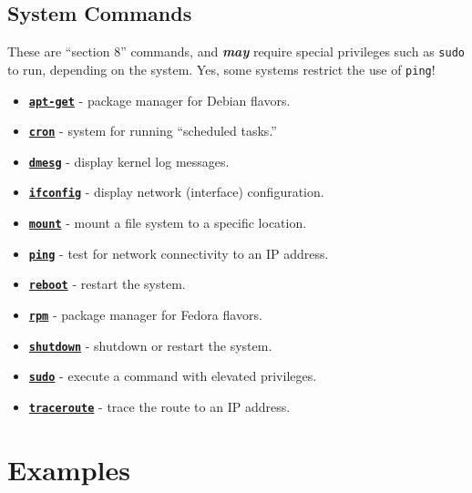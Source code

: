 \documentclass[10pt,]{book}
\numberwithin{figure}{chapter}
\begin{document}
\subsection{System Commands}\label{system-commands}

These are ``section 8'' commands, and \textbf{\emph{may}} require
special privileges such as \texttt{sudo} to run, depending on the
system. Yes, some systems restrict the use of \texttt{ping}!

\begin{itemize}
\itemsep1pt\parskip0pt
\item
  \href{http://linux.die.net/man/8/apt-get}{\textbf{\texttt{apt-get}}} -
  package manager for Debian flavors.
\item
  \href{http://linux.die.net/man/8/cron}{\textbf{\texttt{cron}}} -
  system for running ``scheduled tasks.''
\item
  \href{http://linux.die.net/man/8/dmesg}{\textbf{\texttt{dmesg}}} -
  display kernel log messages.
\item
  \href{http://linux.die.net/man/8/ifconfig}{\textbf{\texttt{ifconfig}}}
  - display network (interface) configuration.
\item
  \href{http://linux.die.net/man/8/mount}{\textbf{\texttt{mount}}} -
  mount a file system to a specific location.
\item
  \href{http://linux.die.net/man/8/ping}{\textbf{\texttt{ping}}} - test
  for network connectivity to an IP address.
\item
  \href{http://linux.die.net/man/8/reboot}{\textbf{\texttt{reboot}}} -
  restart the system.
\item
  \href{http://linux.die.net/man/8/rpm}{\textbf{\texttt{rpm}}} - package
  manager for Fedora flavors.
\item
  \href{http://linux.die.net/man/8/shutdown}{\textbf{\texttt{shutdown}}}
  - shutdown or restart the system.
\item
  \href{http://linux.die.net/man/8/sudo}{\textbf{\texttt{sudo}}} -
  execute a command with elevated privileges.
\item
  \href{http://linux.die.net/man/8/traceroute}{\textbf{\texttt{traceroute}}}
  - trace the route to an IP address.
\end{itemize}

\section{Examples}\label{examples}
\end{document}
